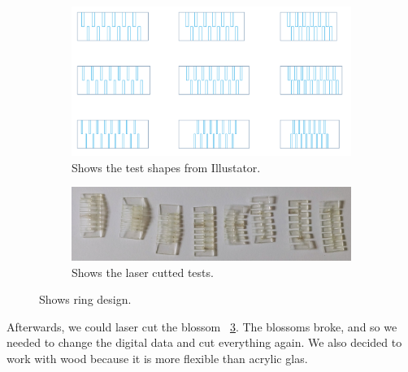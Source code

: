 \documentclass[doc.tex]{subfiles}
\begin{document}
        \begin{figure}[H]
            \centering
            \begin{subfigure}{.5\textwidth}
              \centering
              \includegraphics[width=.8\linewidth]{images/process/test_shapes.PNG}
              \caption{Shows the test shapes from Illustator.}
              \label{fig:test_shapes}
            \end{subfigure}%
            \begin{subfigure}{.5\textwidth}
              \centering
              \includegraphics[width=.8\linewidth]{images/process/laserCutTests.jpg}
              \caption{Shows the laser cutted tests.}
              \label{fig:ringdesign2}
            \end{subfigure}
            \caption{Shows ring design.}
            \label{fig:laserCutTests}
        \end{figure}
        \noindent
        Afterwards, we could laser cut the blossom ~\ref{fig:laserCutTests}. The blossoms broke, and so we needed
        to change the digital data and cut everything again. We also decided to work with wood because it is more flexible 
        than acrylic glas. 
        
\end{document}
